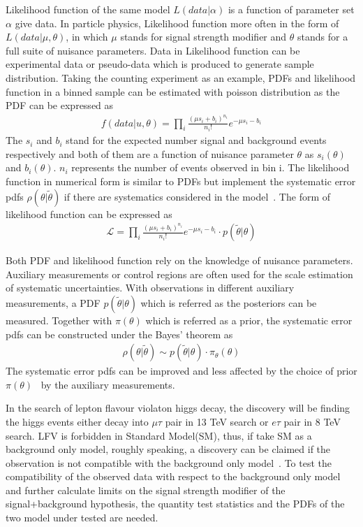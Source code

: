 Likelihood function of the same model $L(data|\alpha)$ is a function of parameter set $\alpha$ give data. In particle physics, Likelihood function more often in the form of $L(data|\mu,\theta)$, in which $\mu$ stands for signal strength modifier and $\theta$ stands for a full suite of nuisance parameters. Data in Likelihood function can be experimental data or pseudo-data which is produced to generate sample distribution. 
Taking the counting experiment as an example, PDFs and likelihood function in a binned sample can be estimated with poisson distribution as the PDF can be expressed as
\begin{align*}
f(data|u,\theta)=\prod_{i}\frac{(\mu s_{i}+b_{i})^{n_{i}}}{n_{i}!}e^{-\mu s_{i}-b_{i}}
\end{align*}
The $s_{i}$ and $b_{i}$ stand for the expected number signal and background events respectively and both of them are a function of nuisance parameter $\theta$ as $s_{i}(\theta)$ and $b_{i}(\theta)$. $n_{i}$ represents the number of events observed in bin i. The likelihood function in numerical form is similar to PDFs but implement the systematic error pdfs $\rho(\theta|\tilde{\theta})$ if there are systematics considered in the model~\cite{CMS-NOTE-2011-005}. The form of likelihood function can be expressed as 
\begin{align*}
\mathcal{L}=\prod_{i}\frac{(\mu s_{i}+b_{i})^{n_{i}}}{n_{i}!}e^{-\mu s_{i}-b_{i}}\cdot p(\tilde{\theta}|\theta)
\end{align*}

Both PDF and likelihood function rely on the knowledge of nuisance parameters. Auxiliary measurements or control regions are often used for the scale estimation of systematic uncertainties. With observations in different auxiliary measurements, a PDF $p(\tilde{\theta}|\theta)$ which is referred as the posteriors can be measured. Together with $\pi(\theta)$ which is referred as a prior, the systematic error pdfs can be constructed under the Bayes' theorem as
\begin{align*}
\rho(\theta|\tilde{\theta})\sim p(\tilde{\theta}|\theta)\cdot \pi_{\theta}(\theta)
\end{align*}
The systematic error pdfs can be improved and less affected by the choice of prior $\pi(\theta)$~\cite{statistics:school2016} by the auxiliary measurements. 

In the search of lepton flavour violaton higgs decay, the discovery will be finding the higgs events either decay into $\mu\tau$ pair in 13 TeV search or $e\tau$ pair in 8 TeV search.  LFV is forbidden in Standard Model(SM), thus, if take SM as a background only model, roughly speaking, a discovery can be claimed if the observation is not compatible with the background only model~\cite{LHCstaticstics}. To test the compatibility of the observed data with respect to the background only model and further calculate limits on the signal strength modifier of the signal+background hypothesis, the quantity test statistics and the PDFs of the two model under tested are needed.

